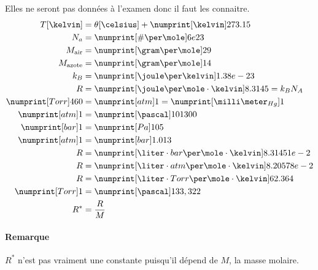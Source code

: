 Elles ne seront pas données à l'examen donc il faut les connaitre.
\begin{align*}
  T[\kelvin] & = \theta[\celsius] + \si{273.15}{\kelvin}\\
  N_a & = \si{6e23}{\#\per\mole}\\
  M_\mathrm{air} & = \si{29}{\gram\per\mole}\\
  M_\mathrm{azote} & = \si{14}{\gram\per\mole}\\
  k_B & = \si{1.38e-23}{\joule\per\kelvin}\\
  R & = \si{8.3145}{\joule\per\mole\cdot\kelvin} = k_B N_A\\
  \si{460}{Torr} & = \si{1}{atm} = \si{1}{\milli\meter_{Hg}}\\
  \si{1}{atm} & = \si{101300}{\pascal}\\
  \si{1}{bar} & = \si{105}{Pa}\\ %
  \si{1}{atm} & = \si{1.013}{bar}\\
  R & = \si{8.31451e-2}{\liter\cdot bar\per\mole\cdot\kelvin}\\
  R & = \si{8.20578e-2}{\liter\cdot atm\per\mole\cdot\kelvin}\\
  R & = \si{62.364}{\liter\cdot Torr\per\mole\cdot\kelvin}\\
  \si{1}{Torr} & = \si{133,322}{\pascal}\\
  R^* & = \frac{R}{M}
\end{align*}

\paragraph{Remarque}
$R^*$ n'est pas vraiment une constante puisqu'il dépend de $M$,
la masse molaire.



